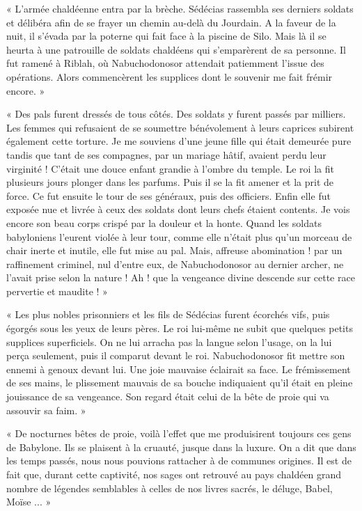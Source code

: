 \documentclass[a4paper, 11pt, oneside, polutonikogreek, french]{article}
\begin{document}
« L'armée chaldéenne entra par la brèche. Sédécias rassembla ses derniers soldats et délibéra afin de se frayer un chemin au-delà du Jourdain. A la faveur de la nuit, il s'évada par la poterne qui fait face à la piscine de Silo. Mais là il se heurta à une patrouille de soldats chaldéens qui s'emparèrent de sa personne. Il fut ramené à Riblah, où Nabuchodonosor attendait patiemment l'issue des opérations. Alors commencèrent les supplices dont le souvenir me fait frémir encore. »

\bigskip
\centerline{\EightStarTaper}
\centerline{\EightStarTaper\EightStarTaper}
\bigskip

« Des pals furent dressés de tous côtés. Des soldats y furent passés par milliers. Les femmes qui refusaient de se soumettre bénévolement à leurs caprices subirent également cette torture. Je me souviens d'une jeune fille qui était demeurée pure tandis que tant de ses compagnes, par un mariage hâtif, avaient perdu leur virginité ! C'était une douce enfant grandie à l'ombre du temple. Le roi la fit plusieurs jours plonger dans les parfums. Puis il se la fit amener et la prit de force. Ce fut ensuite le tour de ses généraux, puis des officiers. Enfin elle fut exposée nue et livrée à ceux des soldats dont leurs chefs étaient contents. Je vois encore son beau corps crispé par la douleur et la honte. Quand les soldats babyloniens l'eurent violée à leur tour, comme elle n'était plus qu'un morceau de chair inerte et inutile, elle fut mise au pal. Mais, affreuse abomination ! par un raffinement criminel, nul d'entre eux, de Nabuchodonosor au dernier archer, ne l'avait prise selon la nature ! Ah ! que la vengeance divine descende sur cette race pervertie et maudite ! »

\bigskip
\centerline{\EightStarTaper}
\centerline{\EightStarTaper\EightStarTaper}
\bigskip

« Les plus nobles prisonniers et les fils de Sédécias furent écorchés vifs, puis égorgés sous les yeux de leurs pères. Le roi lui-même ne subit que quelques petits supplices superficiels. On ne lui arracha pas la langue selon l'usage, on la lui perça seulement, puis il comparut devant le roi. Nabuchodonosor fit mettre son ennemi à genoux devant lui. Une joie mauvaise éclairait sa face. Le frémissement de ses mains, le plissement mauvais de sa bouche indiquaient qu'il était en pleine jouissance de sa vengeance. Son regard était celui de la bête de proie qui va assouvir sa faim. »

« De nocturnes bêtes de proie, voilà l'effet que me produisirent toujours ces gens de Babylone. Ils se plaisent à la cruauté, jusque dans la luxure. On a dit que dans les temps passés, nous nous pouvions rattacher à de communes origines. Il est de fait que, durant cette captivité, nos sages ont retrouvé au pays chaldéen grand nombre de légendes semblables à celles de nos livres sacrés, le déluge, Babel, Moïse ... »
\end{document}
